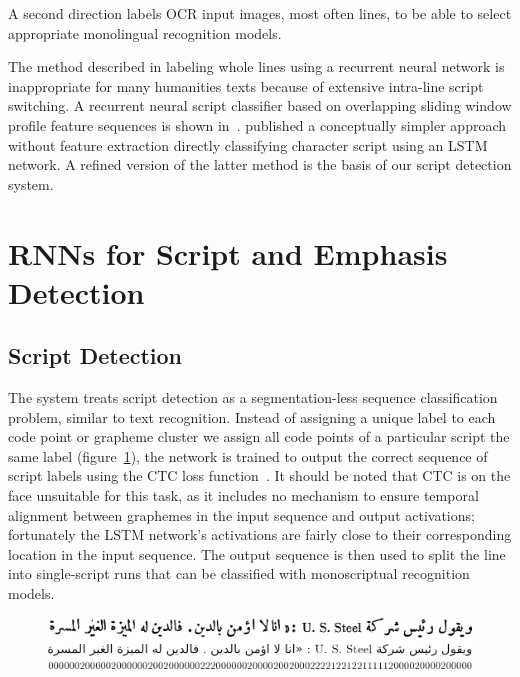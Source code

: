 A second direction labels OCR input images, most often lines, to be able to
select appropriate monolingual recognition models. 

The method described in \cite{fujii2017sequence} labeling whole lines using a
recurrent neural network is inappropriate for many humanities texts because of
extensive intra-line script switching. A recurrent neural script classifier
based on overlapping sliding window profile feature sequences is shown
in~\cite{singh2015can}. \cite{ul2015sequence} published a conceptually
simpler approach without feature extraction directly classifying character
script using an LSTM network. A refined version of the latter method is the
basis of our script detection system.

\section{RNNs for Script and Emphasis Detection}

\subsection{Script Detection}

The system treats script detection as a segmentation-less sequence
classification problem, similar to text recognition. Instead of assigning a
unique label to each code point or grapheme cluster we assign all code points
of a particular script the same label (figure~\ref{fig:read_transcription}), the network is trained to output the
correct sequence of script labels using the CTC loss
function~\cite{graves2006connectionist}. It should be noted that CTC is on the
face unsuitable for this task, as it includes no mechanism to ensure temporal
alignment between graphemes in the input sequence and output activations;
fortunately the LSTM network's activations are fairly close to their
corresponding location in the input sequence. The output sequence is then used
to split the line into single-script runs that can be classified with
monoscriptual recognition models.

\begin{figure}[H]
        \includegraphics[width=\linewidth]{transcription.png}
        \centering
        \label{fig:read_transcription}
\end{figure}

